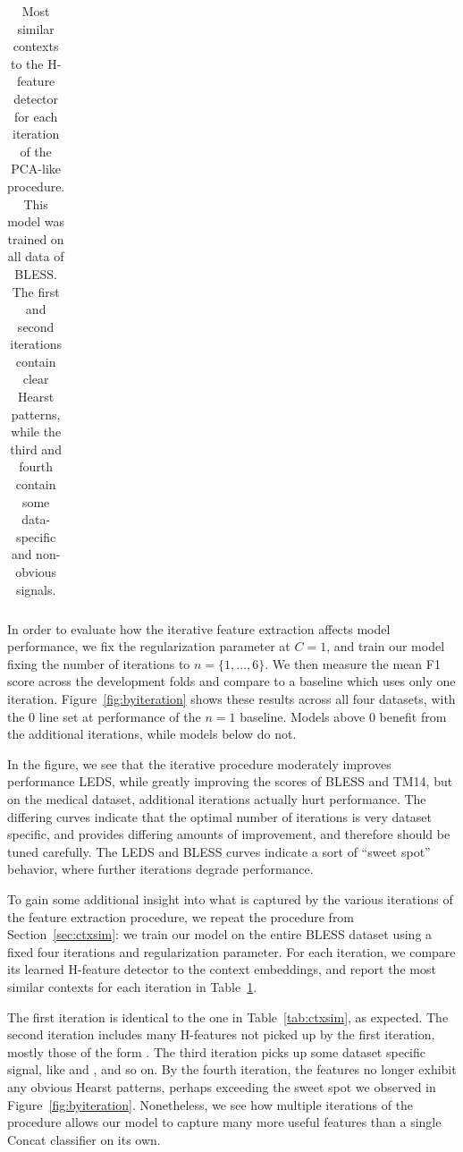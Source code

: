 \begin{table}
\begin{center}
\begin{small}
\begin{tabular}{|ll|}
    \hline
  \end{tabular}
  \end{small}
\end{center}
\caption{Most similar contexts to the H-feature detector for each iteration
of the PCA-like procedure. This model was trained on all data of BLESS. The first and second
iterations contain clear Hearst patterns, while the third and fourth contain
some data-specific and non-obvious signals.}
\label{tab:multiter}
\end{table}

In order to evaluate how the iterative feature extraction affects model
performance, we fix the regularization parameter at $C = 1$, and train our
model fixing the number of iterations to $n = \{1, \ldots, 6\}$.
We then measure the mean F1 score across the development folds and compare to a
baseline which uses only one iteration. Figure~\ref{fig:byiteration} shows
these results across all four datasets, with the 0 line set at performance of
the $n = 1$ baseline. Models above 0 benefit from the additional
iterations, while models below do not.

In the figure, we see that the iterative procedure moderately improves
performance LEDS, while greatly improving the scores of BLESS and TM14, but
on the medical dataset, additional iterations actually hurt performance.
The differing curves indicate that the optimal number of iterations is very
dataset specific, and provides differing amounts of improvement, and therefore
should be tuned carefully. The LEDS and BLESS curves indicate a sort of
``sweet spot'' behavior, where further iterations degrade performance.

To gain some additional insight into what is captured by the various iterations
of the feature extraction procedure, we repeat the procedure from
Section~\ref{sec:ctxsim}: we train our model on the entire BLESS dataset
using a fixed four iterations and regularization parameter. For each iteration,
we compare its learned H-feature detector to the context embeddings, and report
the most similar contexts for each iteration in Table~\ref{tab:multiter}.

The first iteration is identical to the one in Table~\ref{tab:ctxsim}, as
expected. The second iteration includes many H-features not picked up by the
first iteration, mostly those of the form . The
third iteration picks up some dataset specific signal, like  and , and so on. By the fourth iteration,
the features no longer exhibit any obvious Hearst patterns, perhaps exceeding
the sweet spot we observed in Figure~\ref{fig:byiteration}.  Nonetheless, we
see how multiple iterations of the procedure allows our model to capture many
more useful features than a single Concat classifier on its own.

